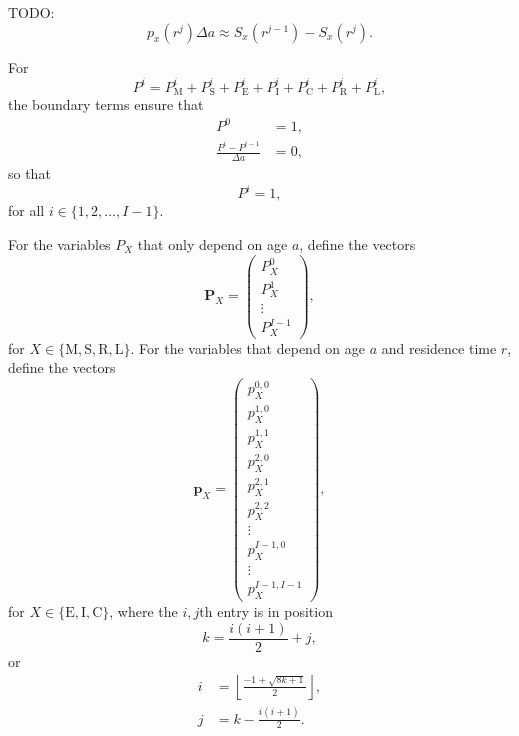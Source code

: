 \documentclass[12pt]{article}
\renewcommand{\vec}[1]{\mathbf{#1}}
\begin{document}
TODO: $$p_x(r^j) \Delta a \approx S_x(r^{j - 1}) - S_x(r^j).$$

For
\begin{equation}
  P^i = P_{\mathrm{M}}^i + P_{\mathrm{S}}^i + P_{\mathrm{E}}^i
  + P_{\mathrm{I}}^i + P_{\mathrm{C}}^i + P_{\mathrm{R}}^i
  + P_{\mathrm{L}}^i,
\end{equation}
the boundary terms ensure that
\begin{align}
  P^0 &= 1,
  \\
  \frac{P^i - P^{i - 1}}{\Delta a} &= 0,
\end{align}
so that
\begin{equation}
  P^i = 1,
\end{equation}
for all $i \in \{1, 2, \ldots, I - 1\}$.

For the variables $P_X$ that only depend on age $a$,
define the vectors
\begin{equation}
  \vec{P}_X =
  \begin{pmatrix}
    P_X^0\\
    P_X^1\\
    \vdots\\
    P_X^{I - 1}
  \end{pmatrix},
\end{equation}
for $X \in \{\mathrm{M}, \mathrm{S}, \mathrm{R}, \mathrm{L}\}$.
For the variables that depend on age $a$ and residence time $r$,
define the vectors
\begin{equation}
  \vec{p}_X =
  \begin{pmatrix}
    p_X^{0, 0}\\
    p_X^{1, 0}\\
    p_X^{1, 1}\\
    p_X^{2, 0}\\
    p_X^{2, 1}\\
    p_X^{2, 2}\\
    \vdots\\
    p_X^{I - 1, 0}\\
    \vdots\\
    p_X^{I - 1, I - 1}
  \end{pmatrix},
\end{equation}
for $X \in \{\mathrm{E}, \mathrm{I}, \mathrm{C}\}$,
where the $i, j$th entry is in position
\begin{equation}
  k = \frac{i (i + 1)}{2} + j,
\end{equation}
or
\begin{align}
  i &= \left\lfloor\frac{- 1 + \sqrt{8 k + 1}}{2}\right\rfloor,
  \\
  j &= k - \frac{i (i + 1)}{2}.
\end{align}
\end{document}

